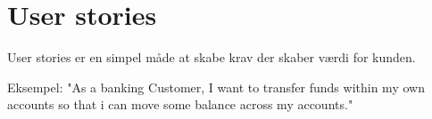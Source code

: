 \section{User stories}

User stories er en simpel måde at skabe krav der skaber værdi for kunden.

Eksempel: "As a banking Customer, I want to transfer funds within my own accounts so that i can
move some balance across my accounts."
